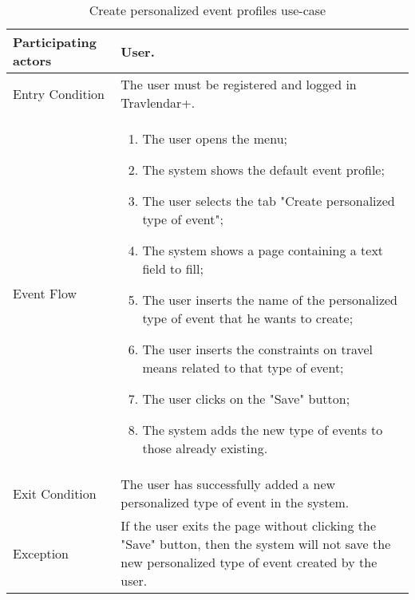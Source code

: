 \begin{table}[H]
	\begin{center}
		\begin{tabular}{ | p{} | p{} | }
		\hline
		Participating actors & User.\\
		\hline
		Entry Condition & The user must be registered and logged in Travlendar+.\\
		\hline
		Event Flow & 
			\begin{enumerate}
				\item The user opens the menu;
				\item The system shows the default event profile;
				\item The user selects the tab "Create personalized type of event";
				\item The system shows a page containing a text field to fill;
				\item The user inserts the name of the personalized type of event that he wants to create;
				\item The user inserts the constraints on travel means related to that type of event;
				\item The user clicks on the "Save" button;
				\item The system adds the new type of events to those already existing.

			\end{enumerate} \\
		\hline
		Exit Condition & The user has successfully added a new personalized type of event in the system.\\
		\hline
		Exception & If the user exits the page without clicking the "Save" button, then the system will not save the new personalized type of event created by the user.\\ 
		\hline
		\end{tabular}
	\end{center}
	\caption{Create personalized event profiles use-case}
\end{table}